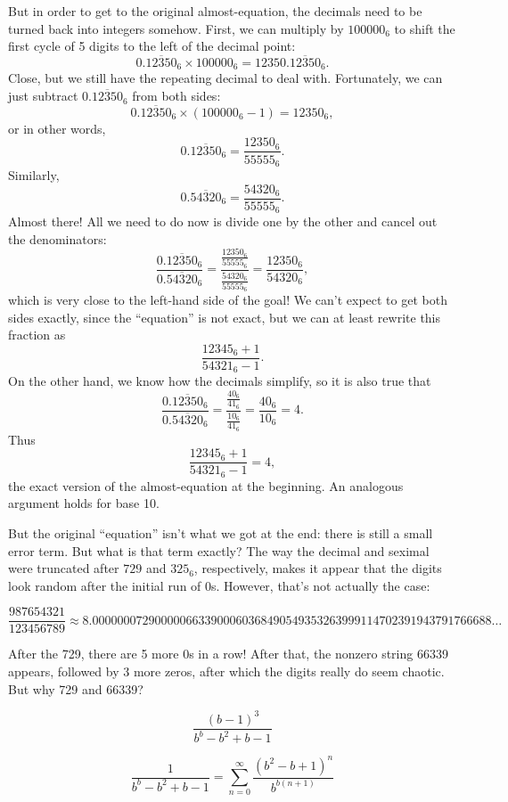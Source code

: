 \documentclass{article}
\begin{document}
But in order to get to the original almost-equation,
the decimals need to be turned back into integers somehow.
First, we can multiply by $100000_6$
to shift the first cycle of 5 digits to the left of the decimal point:
\[0.\overline{12350}_6 \times 100000_6 = 12350.\overline{12350}_6.\]
Close, but we still have the repeating decimal to deal with.
Fortunately, we can just subtract $0.\overline{12350}_6$ from both sides:
\[0.\overline{12350}_6 \times (100000_6-1) = 12350_6,\]
or in other words,
\[0.\overline{12350}_6 = \frac{12350_6}{55555_6}.\]
Similarly,
\[0.\overline{54320}_6 = \frac{54320_6}{55555_6}.\]
Almost there! All we need to do now is divide one by the other
and cancel out the denominators:
\[\frac{0.\overline{12350}_6}{0.\overline{54320}_6}=
\frac{\frac{12350_6}{55555_6}}{\frac{54320_6}{55555_6}}
=\frac{12350_6}{54320_6},\]
which is very close to the left-hand side of the goal!
We can't expect to get both sides exactly,
since the ``equation'' is not exact,
but we can at least rewrite this fraction as
\[\frac{12345_6+1}{54321_6-1}.\]
On the other hand,
we know how the decimals simplify,
so it is also true that
\[\frac{0.\overline{12350}_6}{0.\overline{54320}_6}
=\frac{\frac{40_6}{41_6}}{\frac{10_6}{41_6}}=\frac{40_6}{10_6}=4.\]
Thus
\[\frac{12345_6+1}{54321_6-1}=4,\]
the exact version of the almost-equation at the beginning.
An analogous argument holds for base 10.

\newpage

But the original ``equation'' isn't what we got at the end:
there is still a small error term.
But what is that term exactly?
The way the decimal and seximal were truncated after $729$ and $325_6$, respectively,
makes it appear that the digits look random after the initial run of 0s.
However, that's not actually the case:

\[\frac{987654321}{123456789} \approx 8.0000000729000006633900060368490549353263999114702391943791766688\ldots\]

After the 729, there are 5 more 0s in a row!
After that, the nonzero string 66339 appears,
followed by 3 more zeros,
after which the digits really do seem chaotic.
But why 729 and 66339?

\[\frac{(b-1)^3}{b^b-b^2+b-1}\]

\[\frac{1}{b^b-b^2+b-1} = \sum_{n=0}^\infty \frac{(b^2-b+1)^n}{b^{b(n+1)}} \]
\end{document}
